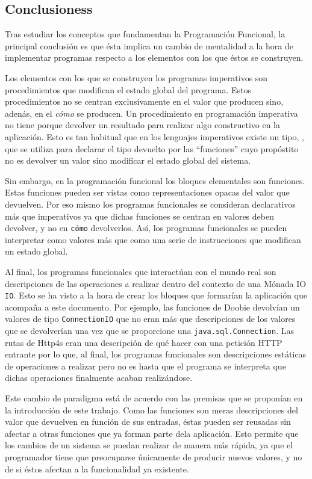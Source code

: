 \documentclass[../main.tex]{subfiles}
\begin{document}
\subsection{Conclusioness}
Tras estudiar los conceptos que fundamentan la Programación Funcional, la principal
conclusión es que ésta implica un cambio de mentalidad a la hora de implementar programas
respecto a los elementos con los que éstos se construyen.

Los elementos con los que se construyen los programas imperativos son procedimientos
que modifican el estado global del programa. Estos procedimientos no se centran exclusivamente
en el valor que producen sino, adenás, en el \textit{cómo} se producen. Un procedimiento en programación
imperativa no tiene porque devolver un resultado para realizar algo constructivo en la aplicación.
Esto es tan habitual que en los lenguajes imperativos existe un tipo, , que se utiliza
para declarar el tipo devuelto por las ``funciones'' cuyo propóstito no es devolver un valor sino  
modificar el estado global del sistema.

Sin embargo, en la programación funcional los bloques elementales son funciones. Estas
funciones pueden ser vistas como representaciones opacas del valor que devuelven. Por eso
mismo los programas funcionales se consideran declarativos más que imperativos ya que
dichas funciones se centran en  valores deben devolver, y no en \texttt{cómo} 
devolverlos. Así, los programas funcionales se pueden interpretar como valores más que como 
una serie de instrucciones que modifican un estado global.

Al final, los programas funcionales que interactúan con el mundo real son descripciones de
las operaciones a realizar dentro del contexto de una Mónada IO \texttt{IO}. Esto se ha visto
a la hora de crear los bloques que formarían la aplicación que acompaña a este documento. Por ejemplo,
las funciones de Doobie devolvían un valores de tipo \texttt{ConnectionIO} que no eran más que
descripciones de los valores que se devolverían una vez que se proporcione una \texttt{java.sql.Connection}.
Las rutas de Http4s eran una descripción de qué hacer con una petición HTTP entrante por lo que, al
final, los programas funcionales son descripciones estáticas de operaciones a realizar pero
no es hasta que el programa se interpreta que dichas operaciones finalmente acaban realizándose.

Este cambio de paradigma está de acuerdo con las premisas que se proponían en la introducción de este trabajo. 
Como las funciones son meras descripciones del valor que devuelven en función de sus entradas, éstas
pueden ser reusadas sin afectar a otras funciones que ya forman parte dela aplicación. Esto permite
que los cambios de un sistema se puedan realizar de manera más rápida, ya que el programador tiene que 
preocuparse únicamente de producir nuevos valores, y no de si éstos afectan a la funcionalidad ya existente.
\end{document}

